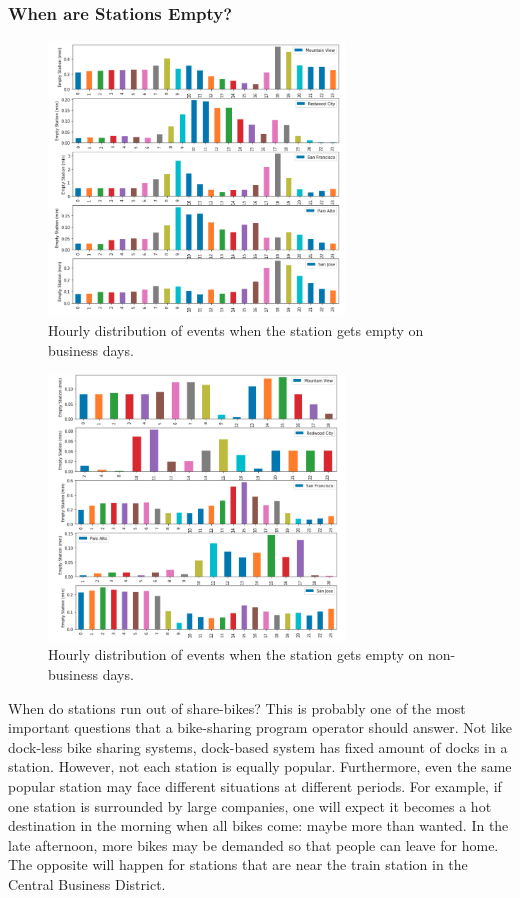 \documentclass[a4paper]{article}
\begin{document}
			\subsubsection{When are Stations Empty?}
			
			\begin{figure}
				\centering
				\includegraphics[width=0.7\textwidth]{EmptyStationBDay.png}
				\caption{\label{fig:empty_station_bday}Hourly distribution of events when the station gets empty on business days.}
			\end{figure}			

			\begin{figure}
				\centering
				\includegraphics[width=0.7\textwidth]{EmptyStationNonBDay.png}
				\caption{\label{fig:empty_station_nonbday}Hourly distribution of events when the station gets empty on non-business days.}
			\end{figure}			
			
			When do stations run out of share-bikes? This is probably one of the most important questions that a bike-sharing program operator should answer. Not like dock-less bike sharing systems, dock-based system has fixed amount of docks in a station. However, not each station is equally popular. Furthermore, even the same popular station may face different situations at different periods. For example, if one station is surrounded by large companies, one will expect it becomes a hot destination in the morning when all bikes come: maybe more than wanted. In the late afternoon, more bikes may be demanded so that people can leave for home. The opposite will happen for stations that are near the train station in the Central Business District. 
			
\end{document}
